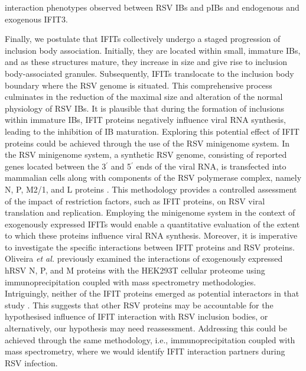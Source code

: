 interaction phenotypes observed between RSV IBs and pIBs and endogenous and exogenous IFIT3.

Finally, we postulate that IFITs collectively undergo a staged progression of inclusion body association. Initially, they are located within small, immature IBs, and as these structures mature, they increase in size and give rise to inclusion body-associated granules. Subsequently, IFITs translocate to the inclusion body boundary where the RSV genome is situated. This comprehensive process culminates in the reduction of the maximal size and alteration of the normal physiology of RSV IBs. It is plausible that during the formation of inclusions within immature IBs, IFIT proteins negatively influence viral RNA synthesis, leading to the inhibition of IB maturation. Exploring this potential effect of IFIT proteins could be achieved through the use of the RSV minigenome system. In the RSV minigenome system, a synthetic RSV genome, consisting of reported genes located between the 3$^{\prime}$ and 5$^{\prime}$ ends of the viral RNA, is transfected into mammalian cells along with components of the RSV polymerase complex, namely N, P, M2/1, and L proteins \cite{Teng2016UseTranscription}. This methodology provides a controlled assessment of the impact of restriction factors, such as IFIT proteins, on RSV viral translation and replication. Employing the minigenome system in the context of exogenously expressed IFITs would enable a quantitative evaluation of the extent to which these proteins influence viral RNA synthesis. Moreover, it is imperative to investigate the specific interactions between IFIT proteins and RSV proteins. Oliveira \textit{et al.} previously examined the interactions of exogenously expressed hRSV N, P, and M proteins with the HEK293T cellular proteome using immunoprecipitation coupled with mass spectrometry methodologies. Intriguingly, neither of the IFIT proteins emerged as potential interactors in that study \cite{Oliveira2013HumanCells}. This suggests that other RSV proteins may be accountable for the hypothesised influence of IFIT interaction with RSV inclusion bodies, or alternatively, our hypothesis may need reassessment. Addressing this could be achieved through the same methodology, i.e., immunoprecipitation coupled with mass spectrometry, where we would identify IFIT interaction partners during RSV infection.

